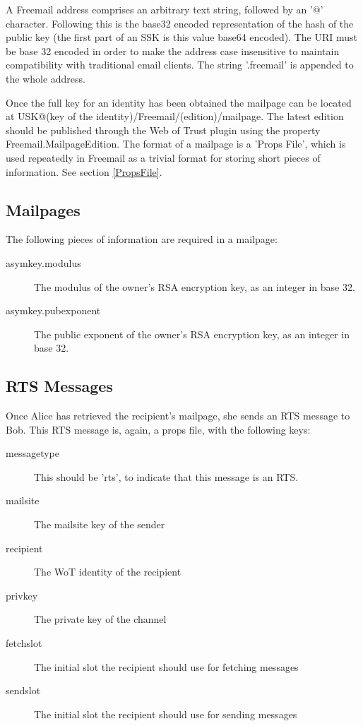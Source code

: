 \documentclass[12pt,a4paper]{article}
\begin{document}
A Freemail address comprises an arbitrary text string, followed by an '@' character. Following this
is the base32 encoded representation of the hash of the public key (the first part of an SSK is
this value base64 encoded). The URI must be base 32 encoded in order to make the address case
insensitive to maintain compatibility with traditional email clients. The string '.freemail' is
appended to the whole address.


Once the full key for an identity has been obtained the mailpage can be located at
USK@(key of the identity)/Freemail/(edition)/mailpage. The latest edition should be published
through the Web of Trust plugin using the property Freemail.MailpageEdition. The format of a
mailpage is a 'Props File', which is used repeatedly in Freemail as a trivial format for storing
short pieces of information. See section \ref{PropsFile}.

\subsection{Mailpages}
The following pieces of information are required in a mailpage:

\begin{description}
\item[asymkey.modulus] The modulus of the owner's RSA encryption key, as an integer in base 32.
\item[asymkey.pubexponent] The public exponent of the owner's RSA encryption key, as an integer in
	base 32.
\end{description}

\subsection{RTS Messages}
Once Alice has retrieved the recipient's mailpage, she sends an RTS message to Bob. This RTS message
is, again, a props file, with the following keys:

\begin{description}
\item[messagetype] This should be 'rts', to indicate that this message is an RTS.
\item[mailsite] The mailsite key of the sender
\item[recipient] The WoT identity of the recipient
\item[privkey] The private key of the channel
\item[fetchslot] The initial slot the recipient should use for fetching messages
\item[sendslot] The initial slot the recipient should use for sending messages
\end{description}
\end{document}
